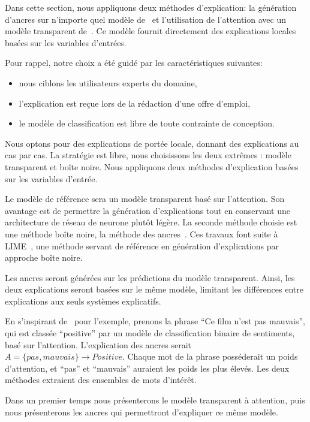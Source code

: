 Dans cette section, nous appliquons deux méthodes d'explication: la génération d'ancres sur n'importe quel modèle de~\cite{Ribeiro2018} et l'utilisation de l'attention avec un modèle transparent de~\cite{Lin2017}.
Ce modèle fournit directement des explications locales basées sur les variables d'entrées.

Pour rappel, notre choix a été guidé par les caractéristiques suivantes:
\begin{itemize}
    \item nous ciblons les utilisateurs experts du domaine,
    \item l'explication est reçue lors de la rédaction d'une offre d'emploi,
    \item le modèle de classification est libre de toute contrainte de conception.
\end{itemize}

Nous optons pour des explications de portée locale, donnant des explications au cas par cas. La stratégie est libre, nous choisissons les deux extrêmes : modèle transparent et boîte noire. Nous appliquons deux méthodes d'explication basées sur les variables d'entrée.

Le modèle de référence sera un modèle transparent basé sur l'attention. Son avantage est de permettre la génération d'explications tout en conservant une architecture de réseau de neurone plutôt légère.
La seconde méthode choisie est une méthode boîte noire, la méthode des ancres~\cite{Ribeiro2018}. Ces travaux font suite à LIME~\cite{Ribeiro2016}, une méthode servant de référence en génération d'explications par approche boîte noire.

Les ancres seront générées sur les prédictions du modèle transparent. Ainsi, les deux explications seront basées sur le même modèle, limitant les différences entre explications aux seuls systèmes explicatifs.

En s'inspirant de~\cite{Ribeiro2018} pour l'exemple, prenons la phrase ``Ce film n'est pas mauvais'', qui est classée ``positive'' par un modèle de classification binaire de sentiments, basé sur l'attention. L'explication des ancres serait $ A = \{pas, mauvais \} \rightarrow Positive $. Chaque mot de la phrase posséderait un poids d'attention, et ``pas'' et ``mauvais'' auraient les poids les plus élevés. Les deux méthodes extraient des ensembles de mots d'intérêt. %

Dans un premier temps nous présenterons le modèle transparent à attention, puis nous présenterons les ancres qui permettront d'expliquer ce même modèle.

